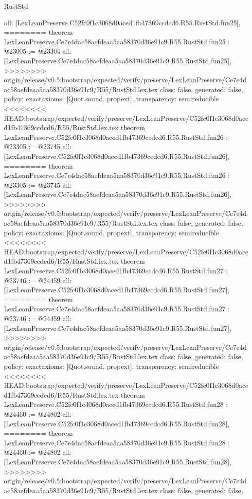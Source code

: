 \begin{lexlean}{RustStd}
\begin{coremodule}
{\begin{coremodule}
{{{{{{{{{{{{{{{{{{{{{{{{{{{{  all: [LexLeanPreserve.C52fc0f1c3068d0aced1fb47369ccdcd6.R55.RustStd.fun25],
========
theorem LexLeanPreserve.Ce7e4dac58aefdeaa5aa58370d36e91c9.R55.RustStd.fun25 : @23005 := @23304 {
  all: [LexLeanPreserve.Ce7e4dac58aefdeaa5aa58370d36e91c9.R55.RustStd.fun25],
>>>>>>>> origin/release/v0.5:bootstrap/expected/verify/preserve/LexLeanPreserve/Ce7e4dac58aefdeaa5aa58370d36e91c9/R55/RustStd.lex.tex
  class: false,
  generated: false,
  policy: exact{axioms: [Quot.sound, propext]},
  transparency: semireducible
}
<<<<<<<< HEAD:bootstrap/expected/verify/preserve/LexLeanPreserve/C52fc0f1c3068d0aced1fb47369ccdcd6/R55/RustStd.lex.tex
theorem LexLeanPreserve.C52fc0f1c3068d0aced1fb47369ccdcd6.R55.RustStd.fun26 : @23305 := @23745 {
  all: [LexLeanPreserve.C52fc0f1c3068d0aced1fb47369ccdcd6.R55.RustStd.fun26],
========
theorem LexLeanPreserve.Ce7e4dac58aefdeaa5aa58370d36e91c9.R55.RustStd.fun26 : @23305 := @23745 {
  all: [LexLeanPreserve.Ce7e4dac58aefdeaa5aa58370d36e91c9.R55.RustStd.fun26],
>>>>>>>> origin/release/v0.5:bootstrap/expected/verify/preserve/LexLeanPreserve/Ce7e4dac58aefdeaa5aa58370d36e91c9/R55/RustStd.lex.tex
  class: false,
  generated: false,
  policy: exact{axioms: [Quot.sound, propext]},
  transparency: semireducible
}
<<<<<<<< HEAD:bootstrap/expected/verify/preserve/LexLeanPreserve/C52fc0f1c3068d0aced1fb47369ccdcd6/R55/RustStd.lex.tex
theorem LexLeanPreserve.C52fc0f1c3068d0aced1fb47369ccdcd6.R55.RustStd.fun27 : @23746 := @24459 {
  all: [LexLeanPreserve.C52fc0f1c3068d0aced1fb47369ccdcd6.R55.RustStd.fun27],
========
theorem LexLeanPreserve.Ce7e4dac58aefdeaa5aa58370d36e91c9.R55.RustStd.fun27 : @23746 := @24459 {
  all: [LexLeanPreserve.Ce7e4dac58aefdeaa5aa58370d36e91c9.R55.RustStd.fun27],
>>>>>>>> origin/release/v0.5:bootstrap/expected/verify/preserve/LexLeanPreserve/Ce7e4dac58aefdeaa5aa58370d36e91c9/R55/RustStd.lex.tex
  class: false,
  generated: false,
  policy: exact{axioms: [Quot.sound, propext]},
  transparency: semireducible
}
<<<<<<<< HEAD:bootstrap/expected/verify/preserve/LexLeanPreserve/C52fc0f1c3068d0aced1fb47369ccdcd6/R55/RustStd.lex.tex
theorem LexLeanPreserve.C52fc0f1c3068d0aced1fb47369ccdcd6.R55.RustStd.fun28 : @24460 := @24802 {
  all: [LexLeanPreserve.C52fc0f1c3068d0aced1fb47369ccdcd6.R55.RustStd.fun28],
========
theorem LexLeanPreserve.Ce7e4dac58aefdeaa5aa58370d36e91c9.R55.RustStd.fun28 : @24460 := @24802 {
  all: [LexLeanPreserve.Ce7e4dac58aefdeaa5aa58370d36e91c9.R55.RustStd.fun28],
>>>>>>>> origin/release/v0.5:bootstrap/expected/verify/preserve/LexLeanPreserve/Ce7e4dac58aefdeaa5aa58370d36e91c9/R55/RustStd.lex.tex
  class: false,
  generated: false,
}}}}}}}}}}}}}}}}}}}}}}}}}}}}}}}}
\end{coremodule}}
\end{coremodule}
\end{lexlean}
